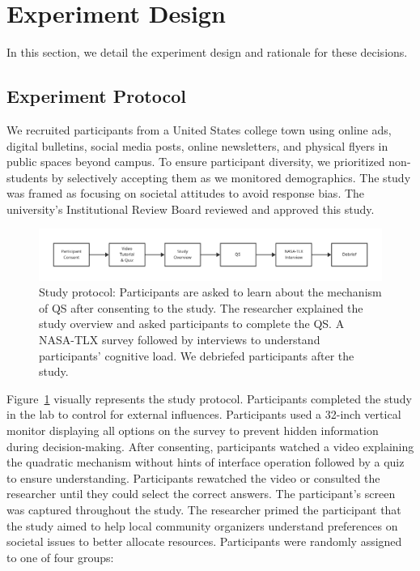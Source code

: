 \section{Experiment Design}
\label{sec:experiment}
In this section, we detail the experiment design and rationale for these decisions.

\subsection{Experiment Protocol}
We recruited participants from a United States college town using online ads, digital bulletins, social media posts, online newsletters, and physical flyers in public spaces beyond campus. To ensure participant diversity, we prioritized non-students by selectively accepting them as we monitored demographics. The study was framed as focusing on societal attitudes to avoid response bias. The university's Institutional Review Board reviewed and approved this study.

\begin{figure}[ht!]
    \centering
    \includegraphics[width=1\textwidth]{content/image/study_flow.pdf}
    \caption{Study protocol: Participants are asked to learn about the mechanism of QS after consenting to the study. The researcher explained the study overview and asked participants to complete the QS. A NASA-TLX survey followed by interviews to understand participants' cognitive load. We debriefed participants after the study.}
    \label{fig:studyProtocol}
\end{figure}

Figure~\ref{fig:studyProtocol} visually represents the study protocol. Participants completed the study in the lab to control for external influences. Participants used a 32-inch vertical monitor displaying all options on the survey to prevent hidden information during decision-making. After consenting, participants watched a video explaining the quadratic mechanism without hints of interface operation followed by a quiz to ensure understanding. Participants rewatched the video or consulted the researcher until they could select the correct answers. The participant's screen was captured throughout the study. The researcher primed the participant that the study aimed to help local community organizers understand preferences on societal issues to better allocate resources. Participants were randomly assigned to one of four groups:

